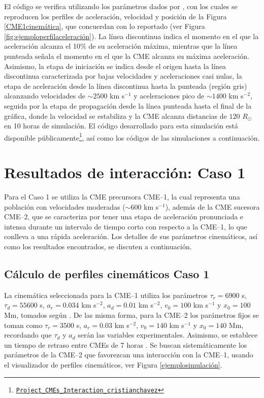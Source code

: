 El código se verifica utilizando los parámetros dados por \textcite[][]{gallagher-2003}, con los cuales se reproducen los perfiles de aceleración, velocidad y posición de la Figura \ref{CME1cinemática}, que concuerdan con lo reportado (ver Figura \ref{fig:ejemploperfilaceleración}). La línea discontinua indica el momento en el que la aceleración alcanza el 10$\%$ de su aceleración máxima, mientras que la línea punteada señala el momento en el que la CME alcanza su máxima aceleración. Asimismo, la etapa de iniciación se indica desde el origen hasta la línea discontinua caracterizada por bajas velocidades y aceleraciones casi nulas, la etapa de aceleración desde la línea discontinua hasta la punteada (región gris) alcanzando velocidades de $\sim2500$ km s$^{-1}$ y aceleraciones pico de $\sim1400$ km s$^{-2}$, seguida por la etapa de propagación desde la línea punteada hasta el final de la gráfica, donde la velocidad se estabiliza y la CME alcanza distancias de $120$ $R_\odot$ en 10 horas de simulación. El código desarrollado para esta simulación está disponible públicamente\footnote{\href{https://github.com/cristianchavez01-svg/Aproximacion-cinematica-de-la-interaccion-entre-eyecciones-de-masa-coronal-homologas.git}{\texttt{Project\_CMEs\_Interaction\_cristianchavez}}}, así como los códigos de las simulaciones a continuación.

\section{Resultados de interacción: Caso 1}
\label{ResultadosCaso1}
Para el Caso 1 se utiliza la CME precursora CME--1, la cual representa una población con velocidades moderadas ($\sim600$ km s$^{-1}$), además de la CME sucesora CME--2, que se caracteriza por tener una etapa de aceleración pronunciada e intensa durante un intervalo de tiempo corto con respecto a la CME--1, lo que conlleva a una rápida aceleración. Los detalles de sus parámetros cinemáticos, así como los resultados encontrados, se discuten a continuación.

\subsection{Cálculo de perfiles cinemáticos Caso 1}

La cinemática seleccionada para la CME--1 utiliza los parámetros $\tau_r=6900$ s, $\tau_d=55600$ s, $a_r=0.034$ km s$^{-2}$, $a_d=0.01$ km s$^{-2}$, $v_0=100$ km s$^{-1}$ y $x_0=100$ Mm, tomados según \textcite[e.g.,][]{aschwanden-2019, ravishankar-2020}. De las misma forma, para la CME--2 los parámetros fijos se toman como $\tau_r=3500$ s, $a_r=0.03$ km s$^{-2}$, $v_0=140$ km s$^{-1}$ y $x_0=140$ Mm, recordando que $\tau_d$ y $a_d$ serán las variables experimentales. Asimismo, se establece un tiempo de retraso entre CMEs de 7 horas \parencite[e.g.,][]{wang-2013}. Se buscan sistemáticamente los parámetros de la CME--2 que favorezcan una interacción con la CME--1, usando el visualizador de perfiles cinemáticos, ver Figura \ref{ejemplosimulación}.


